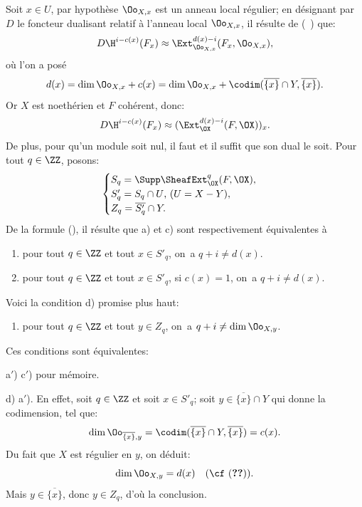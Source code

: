 Soit $x\in U$, par hypoth\`ese $\Oo_{X, x}$ est un anneau local r\'egulier; en d\'esignant par $D$ le foncteur dualisant relatif \`a l'anneau local $\Oo_{X, x}$, il r\'esulte de (~) que:
\[D\H^{i-c(x)}(F_x)\approx \Ext^{d(x)-i}_{\Oo_{X, x}}(F_x, \Oo_{X, x}), \]
o\`u l'on a pos\'e
\begin{equation} \label{eq:VIII.2.2} d(x)=\dim \Oo_{X, x} + c(x) = \dim \Oo_{X, x}+\codim(\overline{\{x\}}\cap Y, \overline{\{x\}}).
\end{equation}
Or $X$ est noeth\'erien et $F$ coh\'erent, donc:
\begin{equation} \label{eq:VIII.2.3} D\H^{i-c(x)}(F_x)\approx (\Ext^{d(x)-i}_{\OX}(F, \OX))_x.
\end{equation}
De plus, pour qu'un module soit nul, il faut et il suffit que son dual le soit. Pour tout $q\in\ZZ$, posons\pageoriginale:
\begin{equation} \label{eq:VIII.2.4}
\begin{cases}
S_q=\Supp \SheafExt^q_{\OX}(F, \OX), \\
S'_q=S_q\cap U\text{, (}U=X-Y\text{)}, \\
Z_q=\overline{S'_q}\cap Y.
\end{cases}
\end{equation}
De la formule (), il r\'esulte que a) et c) sont respectivement \'equivalentes \`a
\begin{enumerate}
\item[a$'$)]
pour tout $q\in\ZZ$ et tout $x\in S'_q$, on~a $q+i\neq d(x)$.

\item[c$'$)]
pour tout $q\in\ZZ$ et tout $x\in S'_q$, si $c(x)=1$, on~a $q+i\neq d(x)$.
\end{enumerate}
\noindent Voici la condition d) promise plus haut:
\begin{enumerate}
\item[d)]
pour tout $q\in \ZZ$ et tout $y\in Z_q$, on~a $q+i\neq \dim \Oo_{X, y}$.
\end{enumerate}
\noindent Ces conditions sont \'equivalentes:

a$'$) \ALORS c$'$) pour m\'emoire.

d) \ALORS a$'$). En effet, soit $q\in \ZZ$ et soit $x\in S'_q$; soit $y\in\overline{\{x\}}\cap Y$ qui \og donne la codimension\fg, \ie tel que:
\begin{equation} \label{eq:VIII.2.5} \dim \Oo_{\overline{\{x\}}, y}=\codim(\overline{\{x\}}\cap Y, \overline{\{x\}})=c(x).
\end{equation}
Du fait que $X$ est r\'egulier en $y$, on d\'eduit:
\begin{equation} \label{eq:VIII.2.6} \dim \Oo_{X, y}=d(x)\quad \text{(\cf (\Ref{eq:VIII.2.2})).}
\end{equation}
Mais $y\in\overline{\{x\}}$, donc $y\in Z_q$, d'o\`u la conclusion.

